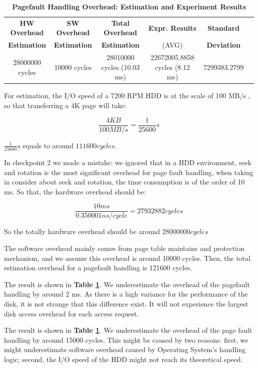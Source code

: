 \begin{table}[ht]
  \centering
  \caption{\textbf{Pagefault Handling Overhead: Estimation and Experiment Results}}
  \begin{threeparttable}
  \begin{tabular}{cccccc}
  \hline
        \textbf{HW Overhead} & \textbf{SW Overhead } & \textbf{Total Overhead} & \textbf{Expr. Results} & \textbf{Standard}\\
        \textbf{Estimation}       &  \textbf{Estimation}         & \textbf{Estimation}  & (AVG)   & \textbf{Deviation} \\
  \hline
        28000000 cycles & 10000 cycles & 28010000 cycles (10.03 ms)  & 22672005.8858 cycles (8.12 ms) & 7299383.2799 \\
  \hline
  \end{tabular}
  \end{threeparttable}
  \label{pagefault_handle_time}
\end{table}

For estimation, the I/O speed of a 7200 RPM HDD is at the scale of 100 MB/s \cite{wiki:hdd}, so that transferring a 4K page will take:

$$ \frac{4KB}{100 MB/s} = \frac{1}{25600} s $$

$\frac{1}{25600} s$ equals to around $111600 cycles$.

In checkpoint 2 we made a mistake: we ignored that in a HDD environment, seek and rotation is the most significant overhead for page fault handling, when taking in consider about seek and rotation, the time consumption is of the order of 10 ms. So that, the hardware overhead should be:

$$\frac{10 ms}{0.350001 ns/cycle} = 27932882 cycles$$

So the totally hardware overhead should be around $28000000 cycles$

The software overhead mainly comes from page table maintains and protection mechanism, and we assume this overhead is around 10000 cycles. Then, the total estimation overhead for a pagefault handling is 121600 cycles.

The result is shown in \textbf{Table \ref{pagefault_handle_time}}. We underestimate the overhead of the pagefault handling by around 2 ms. As there is a high variance for the performance of the disk, it is not strange that this difference exist. It will not experience the largest disk access overhead for each access request.

The result is shown in \textbf{Table \ref{pagefault_handle_time}}. We underestimate the overhead of the page fault handling by around 15000 cycles. This might be caused by two reasons: first, we might underestimate software overhead caused by Operating System's handling logic; second, the I/O speed of the HDD might not reach its theoretical speed.


